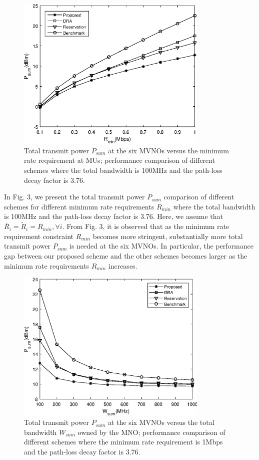 \documentclass[journal]{IEEEtran}
\begin{document}
\begin{figure}
	\centering
	\includegraphics[width=3.6in]{P_rmin.eps}
	\caption{Total transmit power $P_{sum}$ at the six MVNOs versus the minimum rate requirement at MUs; performance comparison of different schemes where the total bandwidth is 100MHz and the path-loss decay factor is 3.76.}
\end{figure}

In Fig. 3, we present the total transmit power $P_{sum}$ comparison of different schemes for different minimum rate requirements $R_{min}$ where the total bandwidth is 100MHz and the path-loss decay factor is 3.76. Here, we assume that $\bar{R}_i = \tilde{R}_i= R_{min}, \forall i$. From Fig. 3, it is observed that as the minimum rate requirement constraint $R_{min}$ becomes more stringent, substantially more total transmit power $P_{sum}$ is needed at the six MVNOs. In particular, the performance gap between our proposed scheme and the other schemes becomes larger as the minimum rate requirements $R_{min}$ increases.

\begin{figure}
	\centering
	\includegraphics[width=3.6in]{P_wsum.eps}
	\caption{Total transmit power $P_{sum}$ at the six MVNOs versus the total bandwidth $W_{sum}$ owned by the MNO; performance comparison of different schemes where the minimum rate requirement is 1Mbps and the path-loss decay factor is 3.76.}
\end{figure}
\end{document}
